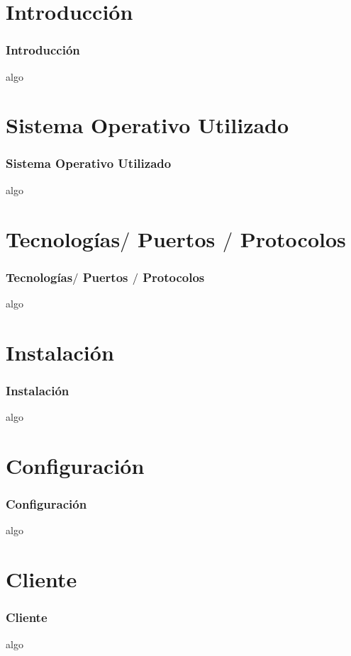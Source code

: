 \section{Introducci\'on}
  \begin{frame}
    \frametitle{Introducci\'on}
    algo
  \end{frame}
\section{Sistema Operativo Utilizado}
  \begin{frame}
    \frametitle{Sistema Operativo Utilizado}
    algo
  \end{frame}
\section{Tecnolog\'ias$/$ Puertos $/$ Protocolos}
  \begin{frame}
    \frametitle{Tecnolog\'ias$/$ Puertos $/$ Protocolos}
    algo
  \end{frame}
\section{Instalaci\'on}
  \begin{frame}
    \frametitle{Instalaci\'on}
    algo
  \end{frame}
\section{Configuraci\'on}
  \begin{frame}
    \frametitle{Configuraci\'on}
    algo
  \end{frame}
\section{Cliente}
  \begin{frame}
    \frametitle{Cliente}
    algo
  \end{frame}
